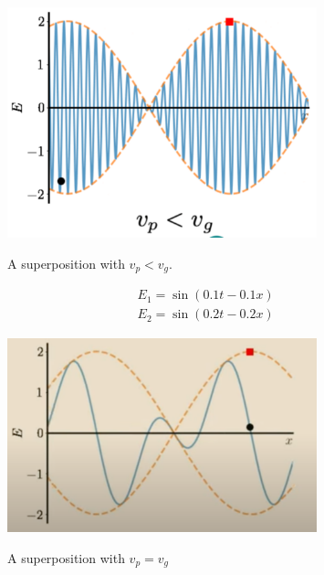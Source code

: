\begin{figure}[H]
   \centering
    \includegraphics[width=0.8\textwidth]{lesson6/vp_less_vg.pdf}
    \label{fig: 1}
    
        \caption{A superposition with $v_p < v_g$.}
    
\end{figure}

\begin{equation}
\begin{aligned}
&E_{1}=\sin (0.1 t-0.1 x) \\
&E_{2}=\sin (0.2 t-0.2 x)
\end{aligned}
\end{equation}

\begin{figure}[H]
   \centering
    \includegraphics[width=0.8\textwidth]{lesson6/vp_equal_vg.pdf}
    \label{fig: 1}
    
        \caption{A superposition with $v_p = v_g$}
    
\end{figure}

